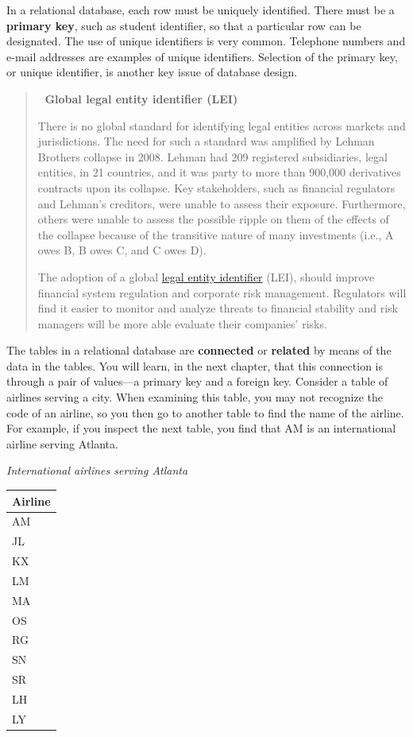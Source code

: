 \documentclass[
]{article}
\begin{document}
In a relational database, each row must be uniquely identified. There
must be a \textbf{primary key}, such as student identifier, so that a
particular row can be designated. The use of unique identifiers is very
common. Telephone numbers and e-mail addresses are examples of unique
identifiers. Selection of the primary key, or unique identifier, is
another key issue of database design.

\begin{quote}
💠 \textbf{Global legal entity identifier (LEI)}

There is no global standard for identifying legal entities across
markets and jurisdictions. The need for such a standard was amplified by
Lehman Brothers collapse in 2008. Lehman had 209 registered
subsidiaries, legal entities, in 21 countries, and it was party to more
than 900,000 derivatives contracts upon its collapse. Key stakeholders,
such as financial regulators and Lehman's creditors, were unable to
assess their exposure. Furthermore, others were unable to assess the
possible ripple on them of the effects of the collapse because of the
transitive nature of many investments (i.e., A owes B, B owes C, and C
owes D).

The adoption of a global \href{https://www.lei-worldwide.com}{legal
entity identifier} (LEI), should improve financial system regulation and
corporate risk management. Regulators will find it easier to monitor and
analyze threats to financial stability and risk managers will be more
able evaluate their companies' risks.
\end{quote}

The tables in a relational database are \textbf{connected} or
\textbf{related} by means of the data in the tables. You will learn, in
the next chapter, that this connection is through a pair of values---a
primary key and a foreign key. Consider a table of airlines serving a
city. When examining this table, you may not recognize the code of an
airline, so you then go to another table to find the name of the
airline. For example, if you inspect the next table, you find that AM is
an international airline serving Atlanta.

\emph{International airlines serving Atlanta}

\begin{longtable}[]{@{}l@{}}
\toprule()
Airline \\
\midrule()
\endhead
AM \\
JL \\
KX \\
LM \\
MA \\
OS \\
RG \\
SN \\
SR \\
LH \\
LY \\
\bottomrule()
\end{longtable}
\end{document}
